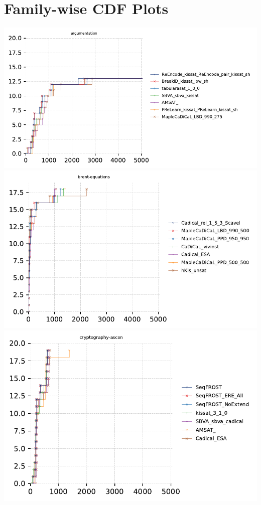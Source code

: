 \documentclass{article}
\begin{document}
\section{Family-wise CDF Plots}

\includegraphics[width=\linewidth]{gen/sc2023/cdfs/cdf-argumentation.pdf}
\includegraphics[width=\linewidth]{gen/sc2023/cdfs/cdf-brent-equations.pdf}
\includegraphics[width=\linewidth]{gen/sc2023/cdfs/cdf-cryptography-ascon.pdf}
\end{document}
